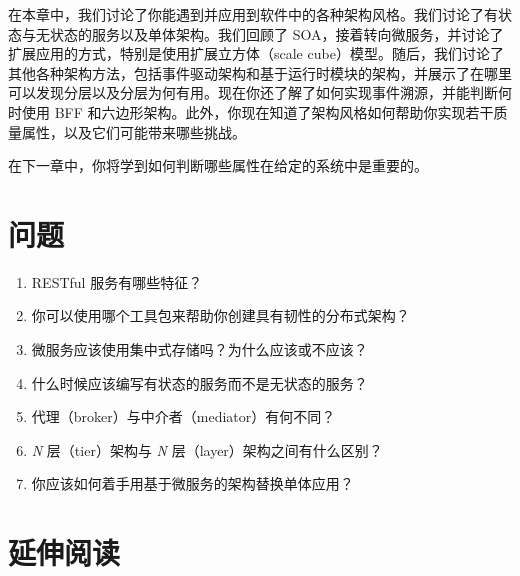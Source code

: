 在本章中，我们讨论了你能遇到并应用到软件中的各种架构风格。我们讨论了有状态与无状态的服务以及单体架构。我们回顾了 SOA，接着转向微服务，并讨论了扩展应用的方式，特别是使用扩展立方体（scale cube）模型。随后，我们讨论了其他各种架构方法，包括事件驱动架构和基于运行时模块的架构，并展示了在哪里可以发现分层以及分层为何有用。现在你还了解了如何实现事件溯源，并能判断何时使用 BFF 和六边形架构。此外，你现在知道了架构风格如何帮助你实现若干质量属性，以及它们可能带来哪些挑战。

在下一章中，你将学到如何判断哪些属性在给定的系统中是重要的。

\section{问题}

\begin{enumerate}
\item RESTful 服务有哪些特征？
\item 你可以使用哪个工具包来帮助你创建具有韧性的分布式架构？
\item 微服务应该使用集中式存储吗？为什么应该或不应该？
\item 什么时候应该编写有状态的服务而不是无状态的服务？
\item 代理（broker）与中介者（mediator）有何不同？
\item \emph{N} 层（tier）架构与 \emph{N} 层（layer）架构之间有什么区别？
\item 你应该如何着手用基于微服务的架构替换单体应用？
\end{enumerate}

\section{延伸阅读}

